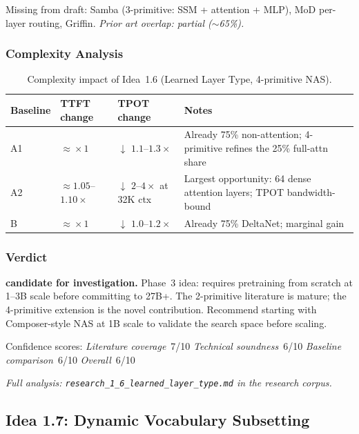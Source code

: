 \documentclass[11pt]{article}
\begin{document}
\noindent
Missing from draft: Samba (3-primitive: SSM + attention + MLP), MoD per-layer routing, Griffin.
\emph{Prior art overlap: partial ($\sim$65\%).}

\subsubsection*{Complexity Analysis}

\begin{table}[h]
\centering
\caption{Complexity impact of Idea~1.6 (Learned Layer Type, 4-primitive NAS).}
\label{tab:complexity-1-6}
\begin{tabular}{lllp{5cm}}
\toprule
\textbf{Baseline} & \textbf{TTFT change} & \textbf{TPOT change} & \textbf{Notes} \\
\midrule
A1 & $\approx\!\times 1$ & $\downarrow$ $1.1$--$1.3\times$ & Already 75\% non-attention; 4-primitive refines the 25\% full-attn share \\
A2 & $\approx 1.05$--$1.10\times$ & $\downarrow$ $2$--$4\times$ at 32K ctx & Largest opportunity: 64 dense attention layers; TPOT bandwidth-bound \\
B  & $\approx\!\times 1$ & $\downarrow$ $1.0$--$1.2\times$ & Already 75\% DeltaNet; marginal gain \\
\bottomrule
\end{tabular}
\end{table}

\subsubsection*{Verdict}
\textbf{candidate for investigation.}
Phase~3 idea: requires pretraining from scratch at 1--3B scale before committing to 27B+.
The 2-primitive literature is mature; the 4-primitive extension is the novel contribution.
Recommend starting with Composer-style NAS at 1B scale to validate the search space before scaling.

\noindent
Confidence scores:
\emph{Literature coverage}~7/10 \quad
\emph{Technical soundness}~6/10 \quad
\emph{Baseline comparison}~6/10 \quad
\emph{Overall}~6/10
\par\noindent\textit{Full analysis: \texttt{research\_1\_6\_learned\_layer\_type.md} in the research corpus.}


\subsection{Idea 1.7: Dynamic Vocabulary Subsetting}
\label{subsec:idea-1-7}
\end{document}
